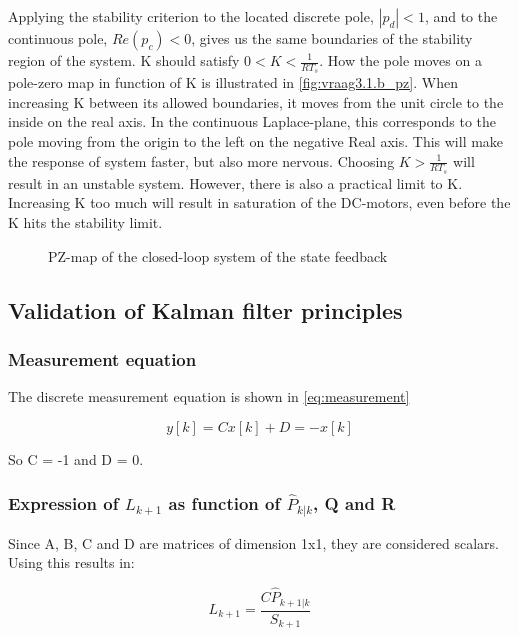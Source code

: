 \documentclass[a4paper]{article}
\newcommand{\newpar}{\vspace{.3cm}\noindent}
\begin{document}
\newpar
Applying the stability criterion to the located discrete pole, $|p_d| < 1$, and to the continuous pole, $Re(p_c) < 0$, gives us the same boundaries of the stability region of the system. K should satisfy $0<K<\frac{1}{RT_s}$. How the pole moves on a pole-zero map in function of K is illustrated in \autoref{fig:vraag3.1.b_pz}. When increasing K between its allowed boundaries, it moves from the unit circle to the inside on the real axis. In the continuous Laplace-plane, this corresponds to the pole moving from the origin to the left on the negative Real axis. This will make the response of system faster, but also more nervous.  Choosing $K>\frac{1}{RT_s}$ will result in an unstable system. However, there is also a practical limit to K. Increasing K too much will result in saturation of the DC-motors, even before the K hits the stability limit.

\begin{figure}[H]
    \caption{PZ-map of the closed-loop system of the state feedback}
    \label{fig:vraag3.1.b_pz}
\end{figure}

\subsection{Validation of Kalman filter principles}
\subsubsection{Measurement equation} 

The discrete measurement equation is shown in \autoref{eq:measurement}

\begin{equation}
    y[k] = Cx[k] + D = -x[k]
    \label{eq:measurement}
\end{equation}

\newpar
So C = -1 and D = 0.

\subsubsection{Expression of \(L_{k+1}\) as function of \(\hat{P}_{k|k}\), Q and R}
\label{section:L_kp1}

Since A, B, C and D are matrices of dimension 1x1, they are considered scalars. Using this results in:

\begin{equation}
    L_{k+1} = \frac{C\hat{P}_{k+1|k}}{S_{k+1}}
\end{equation}
\end{document}
